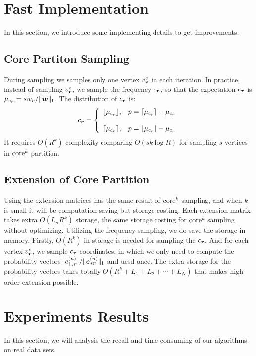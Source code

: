 \documentclass[letterpaper]{article}
\newcommand{\Sca}[3]{{#1}^{(#2)}_{i_#2#3}}%
\newcommand{\V}[1]{{\boldsymbol{{\MakeLowercase{#1}}}}}
\newcommand{\VnC}[3]{\V{#1}^{(#2)}_{#3}}
\newcommand{\norm}[2]{\|#1\|_{#2}}
\newcommand{\AlgLine}[2]{line~\ref{line:#2} of Algorithm~\ref{alg:#1}}
\begin{document}
\section{Fast Implementation}
In this section, we introduce some implementing details to get improvements.
\subsection{Core Partiton Sampling}
During sampling we samples only one vertex $v^c_\V{r}$ in each iteration.
In practice, instead of sampling $v^c_\V{r}$, we sample the frequency $c_\V{r}$,
so that the expectation $c_\V{r}$ is $\mu_{c_\V{r}}=sw_\V{r}/\norm{\V{w}}{1}$.
The distribution of $c_\V{r}$ is:
\begin{equation*}c_\V{r}=
    \left\{
      \begin{array}{ll}
        \lfloor \mu_{c_\V{r}} \rfloor,
        & \hbox{$p=\lceil \mu_{c_\V{r}} \rceil - \mu_{c_\V{r}}$} \\\\
        \lceil \mu_{c_\V{r}} \rceil,
        & \hbox{$p=\lfloor \mu_{c_\V{r}} \rfloor - \mu_{c_\V{r}}$}
      \end{array}
    \right.
\end{equation*}
It requires $O(R^k)$ complexity comparing $O(sk\log{R})$
for sampling $s$ vertices in ${\rm core}^k$ partition.
\subsection{Extension of Core Partition}
Using the extension matrices has the same result of ${\rm core}^k$ sampling,
and when $k$ is small it will be computation saving but storage-costing.
Each extension matrix takes extra $O(L_nR^k)$ storage,
the same storage costing for ${\rm core}^k$ sampling without optimizing.
Utilizing the frequency sampling, we do save the storage in memory.
Firstly, $O(R^k)$ in storage is needed for sampling the $c_\V{r}$.
And for each vertex $v^c_{\V{r}}$,
we sample $c_{\V{r}}$ coordinates,
in which we only need to compute the probability vectors
$|\Sca{e}{n}{\V{r}}|/\norm{\VnC{e}{n}{*\V{r}}}{1}$ and uesd once.
The extra storage for the probability vectors takes totally
$O(R^k + L_1 + L_2 + \cdots + L_N)$
that makes high order extension possible.
\section{Experiments Results}
In this section, we will analysis the recall
and time consuming of our algorithms on real data sets.
\end{document}
